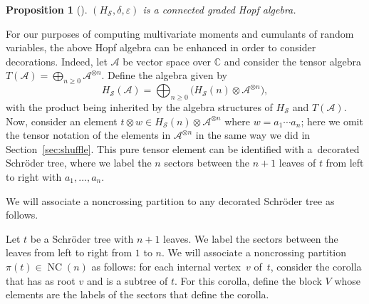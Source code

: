 \documentclass[11pt]{article}
\numberwithin{equation}{section}
\numberwithin{equation}{section}
\newtheorem{Proposition}[Theorem]{Proposition}
 { \theoremstyle{definition}
\newtheorem{Definition}[Theorem]{Definition}
\newtheorem{Example}[Theorem]{Example}
\newtheorem{Remark}[Theorem]{Remark} }
\newcommand{\A}{\mathcal{A}}
\newcommand{\NC}{\operatorname{NC}}
\newcommand{\cHS}{H_\mathcal{S}}
\begin{document}
\begin{Proposition}[\cite{JMNT}]
$(\cHS,\delta,\varepsilon)$ is a connected graded Hopf algebra.
\end{Proposition}

For our purposes of computing multivariate moments and cumulants of random variables, the above Hopf algebra can be enhanced in order to consider decorations. Indeed, let $\A$ be vector space over $\mathbb{C}$ and consider the tensor algebra $T(\A) = \bigoplus_{n\geq0} \A^{\otimes n}$. Define the algebra given by
\[
	\cHS(\A) = \bigoplus_{n\geq0} \big(\cHS(n) \otimes \A^{\otimes n}\big),
\]
with the product being inherited by the algebra structures of $\cHS$ and $T(\A)$. Now, consider an element $t\otimes w\in \cHS(n) \otimes \A^{\otimes n}$ where $w = a_1\cdots a_n$; here we omit the tensor notation of the elements in $\A^{\otimes n}$ in the same way we did in Section~\ref{sec:shuffle}. This pure tensor element can be identified with a~decorated Schr\"oder tree, where we label the $n$ sectors between the $n+1$ leaves of $t$ from left to right with $a_1,\dots, a_n$.

We will associate a noncrossing partition to any decorated Schr\"oder tree as follows.

\begin{Definition}\label{def:pit}
Let $t$ be a Schr\"oder tree with $n+1$ leaves. We label the sectors between the leaves from left to right from $1$ to $n$. We will associate a noncrossing partition $\pi(t) \in \NC(n)$ as follows: for each internal vertex~$v$ of~$t$, consider the corolla that has as root $v$ and is a subtree of $t$. For this corolla, define the block $V$ whose elements are the labels of the sectors that define the corolla.
\end{Definition}
\end{document}
